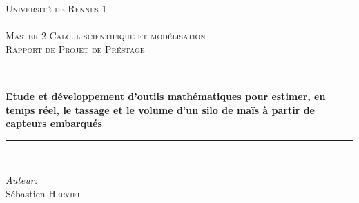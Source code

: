 \documentclass[12pt,a4paper]{report}
\author{Sébastien Hervieu}
\begin{document}
	
\newcommand{\todoRediger}[1]{\todo[color=red,inline]{REDIGER #1}}
\newcommand{\todoARevoir}[1]{\todo[color=red,inline]{A REVOIR #1}}
\newcommand{\todoCompleter}[1]{\todo[inline]{COMPLETER #1}}
\newcommand{\todoAmeliorer}[1]{\todo{AMELIORER: #1}}
\newcommand{\todoMiseEnForme}[1]{\todo[color=green,inline]{MISE EN FORME: #1}}
\newcommand{\todoCheck}[1]{\todo[color=cyan,fancyline]{VERIFIER #1}}
\newcommand{\todoObjectif}{\todo[color=yellow,inline,size=\Large]}

\begin{titlepage}

\newcommand{\HRule}{\rule{\linewidth}{0.5mm}} %

\center %
 

\textsc{\LARGE Université de Rennes 1}\\[1cm] 
\textsc{\Large }\\[0.5cm] %
\textsc{\large Master 2 Calcul scientifique et modélisation}\\
\textsc{Rapport de Projet de Préstage}\\

\HRule \\[0.4cm]
{ \huge \bfseries Etude et développement d’outils mathématiques pour estimer, en temps réel, le tassage et le volume d’un silo de maïs à partir de capteurs embarqués}\\[0.4cm] 
\HRule \\[1.5cm]
 

\begin{minipage}{0.4\textwidth}
\begin{flushleft} \large
\emph{Auteur:}\\
Sébastien \textsc{Hervieu}
\end{flushleft}
\end{minipage}
~
\begin{minipage}{0.4\textwidth}


\end{minipage}
\end{titlepage}
\end{document}

